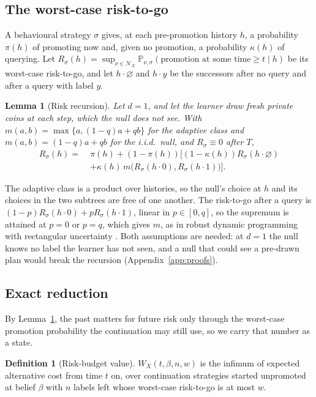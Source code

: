 \documentclass{article}
\theoremstyle{plain}
\newtheorem{lemma}{Lemma}
\theoremstyle{definition}
\newtheorem{definition}{Definition}
\theoremstyle{remark}
\newcommand{\PP}{\mathbb{P}}
\begin{document}
\subsection{The worst-case risk-to-go}

A behavioural strategy $\sigma$ gives, at each pre-promotion history $h$, a probability $\pi(h)$ of promoting now and, given no promotion, a probability $\kappa(h)$ of querying. Let $R_\sigma(h)=\sup_{\nu\in\mathcal{N}_X}\PP_{\nu,\sigma}(\text{promotion at some time}\ge t\mid h)$ be its worst-case risk-to-go, and let $h\cdot\varnothing$ and $h\cdot y$ be the successors after no query and after a query with label $y$.

\begin{lemma}[Risk recursion]
\label{lem:risk}
Let $d=1$, and let the learner draw fresh private coins at each step, which the null does not see. With $m(a,b)=\max\{a,(1-q)a+qb\}$ for the adaptive class and $m(a,b)=(1-q)a+qb$ for the i.i.d.\ null, and $R_\sigma\equiv 0$ after $T$,
\begin{align*}
R_\sigma(h)=\;&\pi(h)+(1-\pi(h))\Big[(1-\kappa(h))R_\sigma(h\cdot\varnothing)\\
&+\kappa(h)\,m\big(R_\sigma(h\cdot 0),R_\sigma(h\cdot 1)\big)\Big].
\end{align*}
\end{lemma}

The adaptive class is a product over histories, so the null's choice at $h$ and its choices in the two subtrees are free of one another. The risk-to-go after a query is $(1-p)R_\sigma(h\cdot 0)+pR_\sigma(h\cdot 1)$, linear in $p\in[0,q]$, so the supremum is attained at $p=0$ or $p=q$, which gives $m$, as in robust dynamic programming with rectangular uncertainty \citep{nilim2005robust,iyengar2005robust}. Both assumptions are needed: at $d=1$ the null knows no label the learner has not seen, and a null that could see a pre-drawn plan would break the recursion (Appendix~\ref{app:proofs}).

\subsection{Exact reduction}

By Lemma~\ref{lem:risk}, the past matters for future risk only through the worst-case promotion probability the continuation may still use, so we carry that number as a state.

\begin{definition}[Risk-budget value]
$W_X(t,\beta,n,w)$ is the infimum of expected alternative cost from time $t$ on, over continuation strategies started unpromoted at belief $\beta$ with $n$ labels left whose worst-case risk-to-go is at most $w$.
\end{definition}
\end{document}
